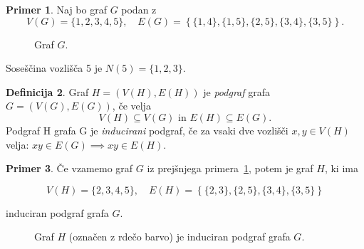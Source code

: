 \documentclass[12pt,a4paper]{amsart}
\theoremstyle{definition} %
\newtheorem{definicija}{Definicija}[section]
\newtheorem{primer}[definicija]{Primer}
\theoremstyle{plain} %
\newcommand{\graf}[1][G]{\ensuremath{#1 = (V(#1), E(#1))}}
\newcommand{\vozlisca}[1][G]{\ensuremath{V(#1)}}
\newcommand{\povezave}[1][G]{\ensuremath{E(#1)}}
\begin{document}
\begin{primer}
    \label{primer:sosedi}
    Naj bo graf $G$ podan z \[\vozlisca = \{ 1,2,3,4,5 \}, \quad \povezave = \left\{ \{1,4\},\{1,5\},\{2,5\},\{3,4\},\{3,5\} \right\}.\]
    \begin{figure}[h]
        \caption{Graf $G$.}
    \end{figure}
    Soseščina vozlišča 5 je $N(5) = \{1,2,3\}$.
\end{primer}

\begin{definicija}
	Graf $\graf[H]$ je \emph{podgraf} grafa $\graf$, če velja 
	\[ \vozlisca[H] \subseteq \vozlisca \text{ in } \povezave[H] \subseteq \povezave. \]
	Podgraf H grafa G je \emph{inducirani} podgraf, če za vsaki dve vozlišči $x,y\in \vozlisca[H]$ velja: $xy \in \povezave \implies xy \in \povezave[H]$.
\end{definicija}

\begin{primer}
    Če vzamemo graf $G$ iz prejšnjega primera~\ref{primer:sosedi}, potem je graf $H$, ki ima
    
    \[ \vozlisca[H] = \{2,3,4,5\},\quad \povezave[H] = \left\{ \{2,3\},\{2,5\},\{3,4\},\{3,5\} \right\} \]
    
    induciran podgraf grafa $G$.
    
    \begin{figure}[h]
        \caption{Graf $H$ (označen z rdečo barvo) je induciran podgraf grafa $G$.}
    \end{figure}
\end{primer}
\end{document}
